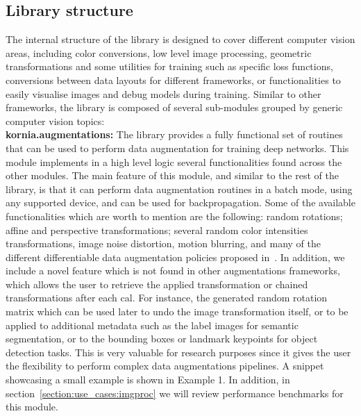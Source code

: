 \subsection{Library structure}
\label{section:kornia:library_structure}

The internal structure of the library is designed to cover different computer vision areas, including color conversions, low level image processing, geometric transformations and some utilities for training  such as specific  loss functions, conversions between data layouts for different frameworks, or functionalities to easily visualise images and debug models during   training. Similar to other frameworks, the library is composed of several sub-modules grouped by generic computer vision topics:\\

\noindent\textbf{kornia.augmentations:} The library provides a fully functional set of routines that can be used to perform data augmentation for training deep networks. This module implements in a high level logic several functionalities found across the other modules. The main feature of this  module, and similar to the rest of the library, is that it can perform data augmentation routines in a batch mode, using any supported device, and can be used for backpropagation. Some of the available functionalities which are worth to mention are the following: random rotations; affine and perspective transformations; several random color intensities transformations, image noise distortion, motion blurring, and many of the different differentiable data augmentation policies proposed in~\citep{DBLP:journals/corr/abs-2004-11966, huang20}. In addition, we include a novel feature which is not found in  other augmentations frameworks, which allows the user to retrieve the applied transformation or chained transformations after each cal. For instance, the generated random rotation matrix which can be used later to undo the image transformation itself, or to be applied to additional metadata such as the label images for semantic segmentation, or to the bounding boxes or landmark keypoints for object detection tasks. This is very valuable for research purposes since it gives  the user the flexibility to perform complex data augmentations pipelines. A snippet showcasing a small example is shown in Example 1. In addition, in section~\ref{section:use_cases:imgproc} we will review performance benchmarks for this module.

\vspace{.5cm}

